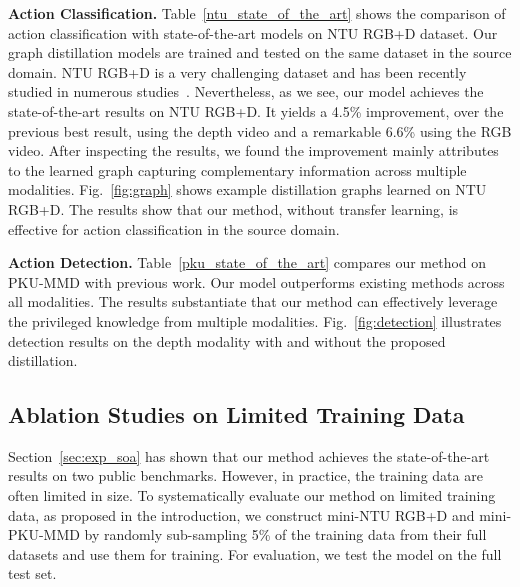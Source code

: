 \noindent\textbf{Action Classification.} Table~\ref{ntu_state_of_the_art} shows the comparison of action classification with state-of-the-art models on NTU RGB+D dataset. Our graph distillation models are trained and tested on the same dataset in the source domain. NTU RGB+D is a very challenging dataset and has been recently studied in numerous studies~\cite{10-stream,liu2017viewpoint,skeleton_visualization,luo2017unsupervised,shahroudy2017deep}. Nevertheless, as we see, our model achieves the state-of-the-art results on NTU RGB+D. It yields a 4.5\% improvement, over the previous best result, using the depth video and a remarkable 6.6\% using the RGB video. After inspecting the results, we found the improvement mainly attributes to the learned graph capturing complementary information across multiple modalities. Fig.~\ref{fig:graph} shows example distillation graphs learned on NTU RGB+D. The results show that our method, without transfer learning, is effective for action classification in the source domain.


\noindent\textbf{Action Detection.} Table~\ref{pku_state_of_the_art} compares our method on PKU-MMD with previous work. Our model outperforms existing methods across all modalities. The results substantiate that our method can effectively leverage the privileged knowledge from multiple modalities. Fig.~\ref{fig:detection} illustrates detection results on the depth modality with and without the proposed distillation.


\subsection{Ablation Studies on Limited Training Data}\label{sec:ablation}
Section~\ref{sec:exp_soa} has shown that our method achieves the state-of-the-art results on two public benchmarks. However, in practice, the training data are often limited in size. To systematically evaluate our method on limited training data, as proposed in the introduction, we construct mini-NTU RGB+D and mini-PKU-MMD by randomly sub-sampling 5\% of the training data from their full datasets and use them for training. For evaluation, we test the model on the full test set.



